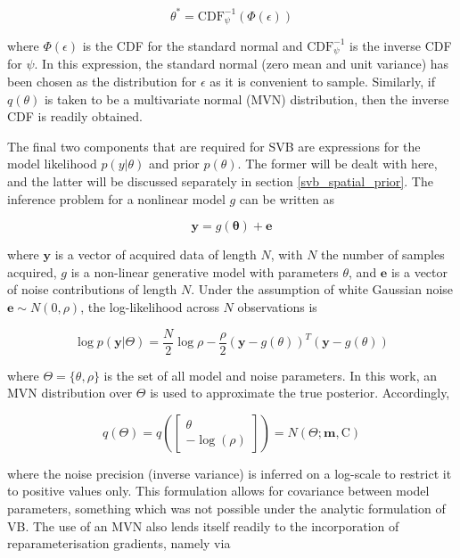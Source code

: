 \documentclass[12pt]{report}
\newcommand{\mat}[1]{\mathrm{#1}}
\renewcommand{\vec}[1]{\mathbf{#1}}
\begin{document}
\begin{equation} 
\theta^* = \mathrm{CDF}^{-1}_{\psi} \left( \Phi(\epsilon) \right)
\end{equation}

where $\Phi(\epsilon)$ is the CDF for the standard normal and $\mathrm{CDF}^{-1}_{\psi}$ is the inverse CDF for $\psi$. In this expression, the standard normal (zero mean and unit variance) has been chosen as the distribution for $\epsilon$ as it is convenient to sample. Similarly, if $q(\theta)$ is taken to be a multivariate normal (MVN) distribution, then the inverse CDF is readily obtained. 

The final two components that are required for SVB are expressions for the model likelihood $p(y|\theta)$ and prior $p(\theta)$. The former will be dealt with here, and the latter will be discussed separately in section \ref{svb_spatial_prior}. The inference problem for a nonlinear model $g$ can be written as 

\begin{equation}
\vec{y} = g(\vec{\theta}) + \vec{e} 
\end{equation}

where $\vec{y}$ is a vector of acquired data of length $N$, with $N$ the number of samples acquired, $g$ is a non-linear generative model with parameters $\theta$, and $\vec{e}$ is a vector of noise contributions of length $N$. Under the assumption of white Gaussian noise $\vec{e} 
\sim N(0, \rho)$, the log-likelihood across $N$ observations is 

\begin{equation}
\log p(\vec{y} | \Theta) = \frac{N}{2} \log \rho - \frac{\rho}{2} (\vec{y} - g(\theta))^T (\vec{y} - g(\theta))
\end{equation}

where $\Theta = \{ \theta, \rho \}$ is the set of all model and noise parameters. In this work, an MVN distribution over $\Theta$ is used to approximate the true posterior. Accordingly,  

\begin{equation}
q(\Theta) = q \left( \begin{bmatrix} \theta \\ -\log(\rho) \end{bmatrix} \right) = N(\Theta; \vec{m}, \mat{C})
\end{equation}

where the noise precision (inverse variance) is inferred on a log-scale to restrict it to positive values only. This formulation allows for covariance between model parameters, something which was not possible under the analytic formulation of VB. The use of an MVN also lends itself readily to the incorporation of reparameterisation gradients, namely via
\end{document}

